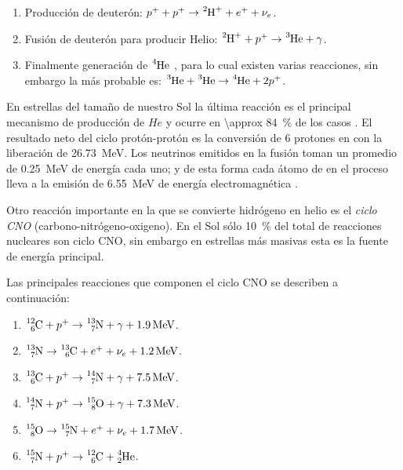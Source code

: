 \begin{enumerate}
  \item Producción de deuterón: $p^{+}+p^{+}\rightarrow\ce{^{2}H^{+}}+e^{+}+\nu_{e}$.
  \item Fusión de deuterón para producir Helio: $\ce{^{2}H^{+}}+p^{+}\rightarrow\ce{^{3}He}+\gamma$.
  \item Finalmente generación de $\ce{^{4}He}$ , para lo cual existen varias reacciones, sin embargo la más probable es: $\ce{^{3}He}+\ce{^{3}He}\rightarrow\ce{^{4}He}+2p^{+}$.
\end{enumerate}

En estrellas del tamaño de nuestro Sol la última reacción es el principal mecanismo de producción de $He$ y ocurre en \SI{\approx 84}{\percent} de los casos \cite{adelberger11}. El resultado neto del ciclo protón-protón es la conversión de \num{6} protones en  con la liberación de \SI{26.73}{\mega\electronvolt}. Los neutrinos emitidos en la fusión toman un promedio de \SI{0.25}{\mega\electronvolt} de energía cada uno; y de esta forma cada átomo de  en el proceso lleva a la emisión de \SI{6.55}{\mega\electronvolt} de energía electromagnética \cite{noyes82}.

Otro reacción importante en la que se convierte hidrógeno en helio es el \emph{ciclo CNO} (carbono-nitrógeno-oxigeno). En el Sol sólo \SI{10}{\percent} del total de reacciones nucleares son ciclo CNO, sin embargo en estrellas más masivas esta es la fuente de energía principal.

Las principales reacciones que componen el ciclo CNO se describen a continuación:

\begin{enumerate}
	\item $\ce{_{6}^{12}C}+p^{+}\rightarrow\ce{_{7}^{13}N}+\gamma+\SI{1.9}{\mega\electronvolt}$.
	\item $\ce{_{7}^{13}N}\rightarrow\ce{_{6}^{13}C}+e^{+}+\nu_{e}+\SI{1.2}{\mega\electronvolt}$.
	\item $\ce{_{6}^{13}C}+p^{+}\rightarrow\ce{_{7}^{14}N}+\gamma+\SI{7.5}{\mega\electronvolt}$.
	\item $\ce{_{7}^{14}N}+p^{+}\rightarrow\ce{_{8}^{15}O}+\gamma+\SI{7.3}{\mega\electronvolt}$.
	\item $\ce{_{8}^{15}O}\rightarrow\ce{_{7}^{15}N}+e^{+}+\nu_{e}+\SI{1.7}{\mega\electronvolt}$.
	\item $\ce{_{7}^{15}N}+p^{+}\rightarrow\ce{_{6}^{12}C}+\ce{_{2}^{4}He}$.
\end{enumerate}

